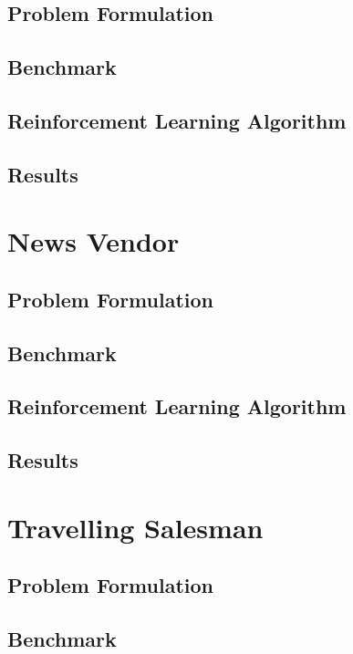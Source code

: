 \documentclass[12pt]{article}
\begin{document}
\subsection{Problem Formulation}

\subsection{Benchmark}

\subsection{Reinforcement Learning Algorithm}

\subsection{Results}

\section{News Vendor}

\subsection{Problem Formulation}

\subsection{Benchmark}

\subsection{Reinforcement Learning Algorithm}

\subsection{Results}

\section{Travelling Salesman}

\subsection{Problem Formulation}

\subsection{Benchmark}
\end{document}
